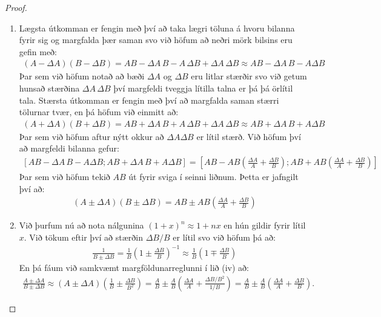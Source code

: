 \begin{proof}
\begin{enumerate}[label = \textbf{(\roman*)}]
    \item Lægsta útkomman er fengin með því að taka lægri töluna á hvoru bilanna fyrir sig og margfalda þær saman svo við höfum að neðri mörk bilsins eru gefin með:
    \begin{align*}
        (A - \Delta A)(B - \Delta B) = AB - \Delta A \, B - A \, \Delta B + \Delta A \, \Delta B \approx AB - \Delta A\, B - A \Delta B
    \end{align*}
    Þar sem við höfum notað að bæði $\Delta A$ og $\Delta B$ eru litlar stærðir svo við getum hunsað stærðina $\Delta A \, \Delta B$ því margfeldi tveggja lítilla talna er þá þá örlítil tala. Stærsta útkomman er fengin með því að margfalda saman stærri tölurnar tvær, en þá höfum við einmitt að:
    \begin{align*}
        (A + \Delta A)(B + \Delta B) = AB + \Delta A \, B + A \, \Delta B + \Delta A \, \Delta B \approx AB + \Delta A\, B + A \Delta B
    \end{align*}
    Þar sem við höfum aftur nýtt okkur að $\Delta A \Delta B$ er lítil stærð. Við höfum því að margfeldi bilanna gefur:
    \begin{align*}
        \left[AB - \Delta A\, B - A \Delta B; AB + \Delta A\, B + A \Delta B\right] = \left[AB - AB\left( \frac{\Delta A}{A} + \frac{\Delta B}{B} \right) ; AB + AB\left( \frac{\Delta A}{A} + \frac{\Delta B}{B} \right) \right]
    \end{align*}
    Þar sem við höfum tekið $AB$ út fyrir sviga í seinni liðnum. Þetta er jafngilt því að:
    \begin{align*}
        (A \pm \Delta A)(B \pm \Delta B) =  AB \pm AB\left( \frac{\Delta A}{A} + \frac{\Delta B}{B} \right)
    \end{align*}
    
    \item Við þurfum nú að nota nálgunina $(1+x)^n \approx 1 + nx$ en hún gildir fyrir lítil $x$. Við tökum eftir því að stærðin $\Delta B/B$ er lítil svo við höfum þá að:
    \begin{align*}
        \frac{1}{B \pm \Delta B} = \frac{1}{B}\left(1 \pm \frac{\Delta B}{B}\right)^{-1} \approx \frac{1}{B}\left(1 \mp \frac{\Delta B}{B} \right)
    \end{align*}
    En þá fáum við samkvæmt margföldunarreglunni í lið (iv) að:
    \begin{align*}
        \frac{A \pm \Delta A}{B \pm \Delta B} \approx \left( A \pm \Delta A \right) \left( \frac{1}{B} \pm \frac{\Delta B}{B^2} \right) = \frac{A}{B} \pm \frac{A}{B}\left( \frac{\Delta A}{A} + \frac{\Delta B / B^2}{1/B} \right) = \frac{A}{B} \pm \frac{A}{B} \left( \frac{\Delta A}{A} + \frac{\Delta B}{B} \right).
    \end{align*}
\end{enumerate}
\end{proof}


